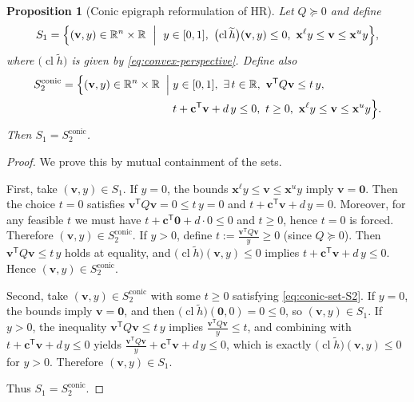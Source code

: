 \documentclass[10pt,a4paper]{amsart}
\newtheorem{proposition}{Proposition}
\begin{document}
\begin{proposition}[Conic epigraph reformulation of HR]
\label{prop:conic-epi-equiv}
Let $Q\succeq 0$ and define
\begin{equation}
\label{eq:conic-set-S1}
S_{1}
=
\Bigl\{(\mathbf v,y)\in\mathbb R^{n}\times\mathbb R \ \Bigm|\ 
y\in[0,1],\ 
\bigl(\operatorname{cl}\widetilde h\bigr)(\mathbf v,y)\le 0,\ 
\mathbf x^{\ell}y\le \mathbf v\le \mathbf x^{u}y
\Bigr\},
\end{equation}
where $\bigl(\operatorname{cl}\widetilde h\bigr)$ is given by \eqref{eq:convex-perspective}. Define also
\begin{equation}
\label{eq:conic-set-S2}
\begin{aligned}
S_{2}^{\mathrm{conic}}
=
\Bigl\{(\mathbf v,y)\in\mathbb R^{n}\times\mathbb R \;\Bigm|\;&
y\in[0,1],\ \exists\, t\in\mathbb R,\ 
\mathbf v^{\mathsf T}Q\mathbf v \le t\,y,\\
& t + \mathbf c^{\mathsf T}\mathbf v + d\,y \le 0,\ 
t\ge 0,\ 
\mathbf x^{\ell}y\le \mathbf v\le \mathbf x^{u}y
\Bigr\}.
\end{aligned}
\end{equation}
Then $S_{1} = S_{2}^{\mathrm{conic}}$.
\end{proposition}

\begin{proof}
We prove this by mutual containment of the sets.

First, take $(\mathbf v,y)\in S_{1}$.
If $y=0$, the bounds $\mathbf x^{\ell}y\le \mathbf v\le \mathbf x^{u}y$ imply $\mathbf v=\mathbf 0$.
Then the choice $t=0$ satisfies $\mathbf v^{\mathsf T}Q\mathbf v = 0 \le t\,y=0$ and
$t+\mathbf c^{\mathsf T}\mathbf v + d\,y = 0$. Moreover, for any feasible $t$ we must have
$t+\mathbf c^{\mathsf T}\mathbf 0 + d\cdot 0 \le 0$ and $t\ge 0$, hence $t=0$ is forced.
Therefore $(\mathbf v,y)\in S_{2}^{\mathrm{conic}}$.
If $y>0$, define $t := \frac{\mathbf v^{\mathsf T}Q\mathbf v}{y}\ge 0$ (since $Q\succeq 0$).
Then $\mathbf v^{\mathsf T}Q\mathbf v \le t\,y$ holds at equality, and
$\bigl(\operatorname{cl}\widetilde h\bigr)(\mathbf v,y)\le 0$ implies
$t+\mathbf c^{\mathsf T}\mathbf v + d\,y \le 0$. Hence $(\mathbf v,y)\in S_{2}^{\mathrm{conic}}$.

Second, take $(\mathbf v,y)\in S_{2}^{\mathrm{conic}}$ with some $t\ge 0$ satisfying \eqref{eq:conic-set-S2}.
If $y=0$, the bounds imply $\mathbf v=\mathbf 0$, and then
$\bigl(\operatorname{cl}\widetilde h\bigr)(\mathbf 0,0)=0\le 0$, so $(\mathbf v,y)\in S_{1}$.
If $y>0$, the inequality $\mathbf v^{\mathsf T}Q\mathbf v \le t\,y$ implies
$\frac{\mathbf v^{\mathsf T}Q\mathbf v}{y}\le t$, and combining with
$t + \mathbf c^{\mathsf T}\mathbf v + d\,y \le 0$ yields
$\frac{\mathbf v^{\mathsf T}Q\mathbf v}{y} + \mathbf c^{\mathsf T}\mathbf v + d\,y \le 0$,
which is exactly $\bigl(\operatorname{cl}\widetilde h\bigr)(\mathbf v,y)\le 0$ for $y>0$.
Therefore $(\mathbf v,y)\in S_{1}$.

Thus $S_{1} = S_{2}^{\mathrm{conic}}$.
\end{proof}
\end{document}
